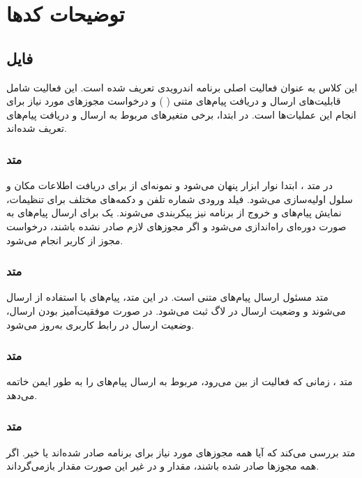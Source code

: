 \documentclass{report}
\begin{document}
\chapter{توضیحات کدها}
\section{فایل
}
این کلاس
 به عنوان فعالیت اصلی برنامه اندرویدی تعریف شده است. این فعالیت شامل قابلیت‌های ارسال و دریافت پیام‌های متنی (
 ) و درخواست مجوزهای مورد نیاز برای انجام این عملیات‌ها است. در ابتدا، برخی متغیرهای مربوط به ارسال و دریافت پیام‌های
   تعریف شده‌اند.

\subsection{متد
}
در متد
 ، ابتدا نوار ابزار پنهان می‌شود و نمونه‌ای از
   برای دریافت اطلاعات مکان و سلول اولیه‌سازی می‌شود. فیلد ورودی شماره تلفن و دکمه‌های مختلف برای تنظیمات، نمایش پیام‌های 
    و خروج از برنامه نیز پیکربندی می‌شوند. یک
     برای ارسال پیام‌های 
      به صورت دوره‌ای راه‌اندازی می‌شود و اگر مجوزهای لازم صادر نشده باشند، درخواست مجوز از کاربر انجام می‌شود.

\subsection{متد
	}
متد
  مسئول ارسال پیام‌های متنی است. در این متد، پیام‌های
   با استفاده از
    ارسال می‌شوند و وضعیت ارسال در لاگ ثبت می‌شود. در صورت موفقیت‌آمیز بودن ارسال، وضعیت ارسال در رابط کاربری به‌روز می‌شود.

\subsection{متد
	}
متد
، زمانی که فعالیت از بین می‌رود،
 مربوط به ارسال پیام‌های
   را به طور ایمن خاتمه می‌دهد.
   
\subsection{متد
	}

متد 
 بررسی می‌کند که آیا همه مجوزهای مورد نیاز برای برنامه صادر شده‌اند یا خیر. اگر همه مجوزها صادر شده باشند، مقدار 
  و در غیر این صورت مقدار 
   بازمی‌گرداند.
\end{document}
